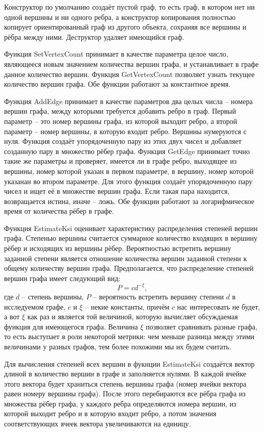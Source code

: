 \documentclass[14pt]{extreport}
\begin{document}
Конструктор по умолчанию создаёт пустой граф, то есть граф, в котором нет ни одной вершины и ни одного ребра, а конструктор копирования полностью копирует ориентированный граф из другого объекта, сохраняя все вершины и рёбра между ними. Деструктор удаляет имеющийся граф.

Функция SetVertexCount принимает в качестве параметра целое число, являющееся новым значением количества вершин графа, и устанавливает в графе данное количество вершин. Функция GetVertexCount позволяет узнать текущее количество вершин графа. Обе функции работают за константное время.

Функция AddEdge принимает в качестве параметров два целых числа -- номера вершин графа, между которыми требуется добавить ребро в граф. Первый параметр -- это номер вершины графа, из которой выходит ребро, а второй параметр -- номер вершины, в которую входит ребро. Вершины нумеруются с нуля. Функция создаёт упорядоченную пару из этих двух чисел и добавляет созданную пару в множество рёбер графа. Функция GetEdge принимает точно такие же параметры и проверяет, имеется ли в графе ребро, выходящее из вершины, номер которой указан в первом параметре, в вершину, номер которой указанан во втором параметре. Для этого функция создаёт упорядоченную пару чисел и ищет её в множестве вершин графа. Если такая пара находится, возвращается истина, иначе -- ложь. Обе функции работают за логарифмическое время от количества рёбер в графе.

Функция EstimateKsi оценивает характеристику распределения степеней вершин графа. Степенью вершины считается суммарное количество входящих в вершину рёбер и исходящих из вершины рёбер. Вероятностью встретить вершину заданной степени является отношение количества вершин заданной степени к общему количеству вершин графа. Предполагается, что распределение степеней вершин графа имеет следующий вид:
$$
P = c d^{-\xi},
$$
где $d$ -- степень вершины, $P$ -- вероятность встретить вершину степени $d$ в исследуемом графе, $c$ и $\xi$ -- некие константы, причём $c$ нас интересовать не будет, а вот $\xi$ как раз и является той величиной, которую вычисляет обсуждаемая функция для имеющегося графа. Величина $\xi$ позволяет сравнивать разные графа, то есть выступает в роли некоторой метрики: чем меньше разница между этими величинами у разных графов, тем более похожими мы их будем считать.

Для вычисления степеней всех вершин в фукнции EstimateKsi создаётся вектор длиной в количество вершин в графе и заполняется нулями. В каждой ячейке этого вектора будет храниться степень вершины графа (номер ячейки вектора равен номеру вершины графа). После этого перебираются все рёбра графа из множества рёбер графа, у каждого ребра определяются номера вершин, из которой выходит ребро и в которую входит ребро, а потом значения соответствующих ячеек вектора увеличиваются на единицу.
\end{document}
